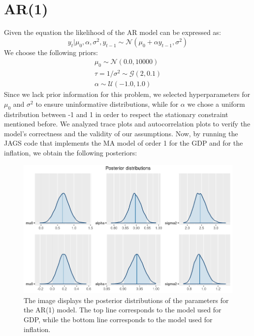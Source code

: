 \section*{AR(1)}
Given the equation  the likelihood of the AR model can be expressed as:
\begin{equation}
    y_{t}|\mu_{0},\alpha,\sigma^2,y_{t-1}\sim \mathcal{N}(\mu_{0} + \alpha y_{t-1}, \sigma^2)
\end{equation}
We choose the following priors:
\begin{equation}
    \begin{split}
        \mu_0 \sim \mathcal{N}(0.0, 10000) \\
        \tau = 1 / \sigma^2 \sim \mathcal{G}(2, 0.1) \\
        \alpha \sim \mathcal{U}(-1.0, 1.0)
    \end{split}
\end{equation}
Since we lack prior information for this problem, we selected hyperparameters for $\mu_{0}$ and $\sigma^2$ to ensure uninformative distributions, while for $\alpha$ we chose a uniform distribution between -1 and 1 in order to respect the stationary constraint mentioned before.
We analyzed trace plots and autocorrelation plots to verify the model's correctness and the validity of our assumptions.
Now, by running the JAGS code that implements the MA model of order 1 for the GDP and for the inflation, we obtain the following posteriors: \\
\begin{figure}[h]
    \centering
    \includegraphics[width=\textwidth]{../Images/2-AR/posteriors.png}
    \caption{The image displays the posterior distributions of the parameters for the AR(1) model. The top line corresponds to the model used for GDP, while the bottom line corresponds to the model used for inflation.}
    \label{fig:AR_posteriors}
\end{figure} \\
